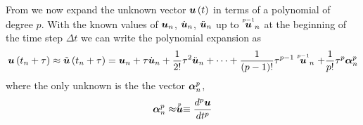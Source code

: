 From \citet{zienkiewicz:2006_1} we now expand the unknown vector $  \boldsymbol{u} \left( t \right) $ in terms of a polynomial of degree
$p$. With the known values of $ \boldsymbol{u} _{n}$, $\dot{ \boldsymbol{u} }_{n}$,
$\ddot{ \boldsymbol{u} }_{n}$ up to $ \stackrel{\scriptscriptstyle p-1}{ \boldsymbol{u} } _{n}$ at the beginning of
the time step $\Delta t$ we can write the polynomial expansion as
\begin{equation}
  \fnof{\vectr{u}}{t_{n}+\tau}\approx\fnof{\tilde{\vectr{u}}}{t_{n}+\tau}=\vectr{u}_{n}+\tau\dot{\vectr{u}}_{n}+
  \frac{1}{2!}\tau^{2}\ddot{\vectr{u}}_{n}+\cdots+\dfrac{1}{\factorial{p-1}}\tau^{p-1}\symover{p-1}{\vectr{u}}_{n}+
  \dfrac{1}{p!}\tau^{p}\vectr{\alpha}^{p}_{n}
  \label{eqn:timepolyexpansion}
\end{equation}
where the only unknown is the the vector $ \boldsymbol{\alpha} ^{p}_{n}$,
\begin{equation}
   \boldsymbol{\alpha} ^{p}_{n}\approx \stackrel{\scriptscriptstyle p}{ \boldsymbol{u} } \equiv \dfrac{ d^{p}  \boldsymbol{u} }{d {t}^{p}} 
\end{equation}

